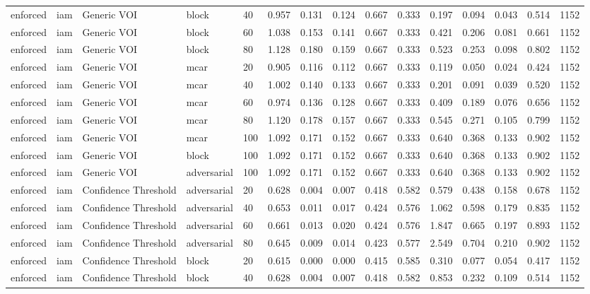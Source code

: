 \begin{table}[!ht]
{\begin{tabular}{lllllllllllllll}
enforced & iam & Generic VOI & block & 40 & 0.957 & 0.131 & 0.124 & 0.667 & 0.333 & 0.197 & 0.094 & 0.043 & 0.514 & 1152 \\
enforced & iam & Generic VOI & block & 60 & 1.038 & 0.153 & 0.141 & 0.667 & 0.333 & 0.421 & 0.206 & 0.081 & 0.661 & 1152 \\
enforced & iam & Generic VOI & block & 80 & 1.128 & 0.180 & 0.159 & 0.667 & 0.333 & 0.523 & 0.253 & 0.098 & 0.802 & 1152 \\
enforced & iam & Generic VOI & mcar & 20 & 0.905 & 0.116 & 0.112 & 0.667 & 0.333 & 0.119 & 0.050 & 0.024 & 0.424 & 1152 \\
enforced & iam & Generic VOI & mcar & 40 & 1.002 & 0.140 & 0.133 & 0.667 & 0.333 & 0.201 & 0.091 & 0.039 & 0.520 & 1152 \\
enforced & iam & Generic VOI & mcar & 60 & 0.974 & 0.136 & 0.128 & 0.667 & 0.333 & 0.409 & 0.189 & 0.076 & 0.656 & 1152 \\
enforced & iam & Generic VOI & mcar & 80 & 1.120 & 0.178 & 0.157 & 0.667 & 0.333 & 0.545 & 0.271 & 0.105 & 0.799 & 1152 \\
enforced & iam & Generic VOI & mcar & 100 & 1.092 & 0.171 & 0.152 & 0.667 & 0.333 & 0.640 & 0.368 & 0.133 & 0.902 & 1152 \\
enforced & iam & Generic VOI & block & 100 & 1.092 & 0.171 & 0.152 & 0.667 & 0.333 & 0.640 & 0.368 & 0.133 & 0.902 & 1152 \\
enforced & iam & Generic VOI & adversarial & 100 & 1.092 & 0.171 & 0.152 & 0.667 & 0.333 & 0.640 & 0.368 & 0.133 & 0.902 & 1152 \\
enforced & iam & Confidence Threshold & adversarial & 20 & 0.628 & 0.004 & 0.007 & 0.418 & 0.582 & 0.579 & 0.438 & 0.158 & 0.678 & 1152 \\
enforced & iam & Confidence Threshold & adversarial & 40 & 0.653 & 0.011 & 0.017 & 0.424 & 0.576 & 1.062 & 0.598 & 0.179 & 0.835 & 1152 \\
enforced & iam & Confidence Threshold & adversarial & 60 & 0.661 & 0.013 & 0.020 & 0.424 & 0.576 & 1.847 & 0.665 & 0.197 & 0.893 & 1152 \\
enforced & iam & Confidence Threshold & adversarial & 80 & 0.645 & 0.009 & 0.014 & 0.423 & 0.577 & 2.549 & 0.704 & 0.210 & 0.902 & 1152 \\
enforced & iam & Confidence Threshold & block & 20 & 0.615 & 0.000 & 0.000 & 0.415 & 0.585 & 0.310 & 0.077 & 0.054 & 0.417 & 1152 \\
enforced & iam & Confidence Threshold & block & 40 & 0.628 & 0.004 & 0.007 & 0.418 & 0.582 & 0.853 & 0.232 & 0.109 & 0.514 & 1152 \\

\end{tabular}}
\end{table}
